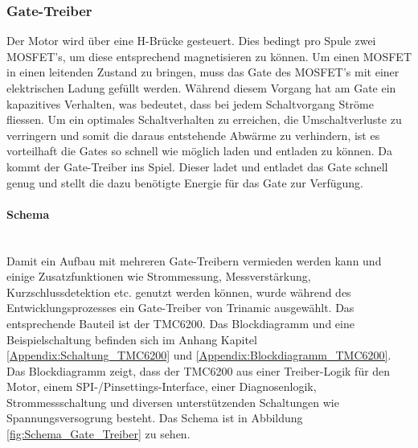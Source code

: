 \subsubsection{Gate-Treiber}
\label{subsubsec:Gate-Treiber}


Der Motor wird über eine H-Brücke gesteuert. Dies bedingt pro Spule zwei MOSFET's, um diese entsprechend magnetisieren zu können. Um einen MOSFET in einen leitenden Zustand zu bringen, muss das Gate des MOSFET's mit einer elektrischen Ladung gefüllt werden. Während diesem Vorgang hat am Gate ein kapazitives Verhalten, was bedeutet, dass bei jedem Schaltvorgang Ströme fliessen. Um ein optimales Schaltverhalten zu erreichen, die Umschaltverluste zu verringern und somit die daraus entstehende Abwärme zu verhindern, ist es vorteilhaft die Gates so schnell wie möglich laden und entladen zu können. Da kommt der Gate-Treiber ins Spiel. Dieser ladet und entladet das Gate schnell genug und stellt die dazu benötigte Energie für das Gate zur Verfügung.

\paragraph{Schema}\mbox{}\\

Damit ein Aufbau mit mehreren Gate-Treibern vermieden werden kann und einige Zusatzfunktionen wie Strommessung, Messverstärkung, Kurzschlussdetektion etc. genutzt werden können, wurde während des Entwicklungsprozesses ein Gate-Treiber von Trinamic ausgewählt. Das entsprechende Bauteil ist der TMC6200. Das Blockdiagramm und eine Beispielschaltung befinden sich im Anhang Kapitel \ref{Appendix:Schaltung_TMC6200} und \ref{Appendix:Blockdiagramm_TMC6200}. Das Blockdiagramm zeigt, dass der TMC6200 aus einer Treiber-Logik für den Motor, einem SPI-/Pinsettings-Interface, einer Diagnosenlogik, Strommessschaltung und diversen unterstützenden Schaltungen wie Spannungsversogrung besteht. Das Schema ist in Abbildung \ref{fig:Schema_Gate_Treiber} zu sehen.


